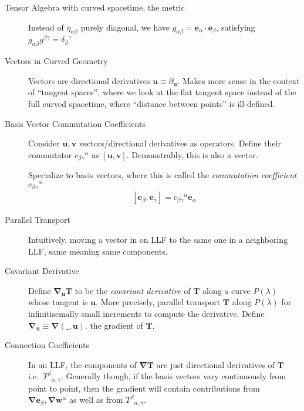 \documentclass[12pt]{report}
\newcommand{\bm}[1]{\boldsymbol{\mathbf{#1}}}
\begin{document}
\begin{description}
    \item[Tensor Algebra with curved spacetime, the metric] Instead of
        $\eta_{\alpha\beta}$ purely diagonal, we have
        $g_{\alpha\beta} = \bm{e}_\alpha \cdot \bm{e}_\beta$, satisfying
        $g_{\alpha\beta}g^{\beta\gamma} = {\delta_{\beta}}^\gamma$

    \item[Vectors in Curved Geometry] Vectors are directional derivatives
        $\bm{u} \equiv \partial_{\bm{u}}$. Makes more sense in the context of
        ``tangent spaces'', where we look at the flat tangent space instead of
        the full curved spacetime, where ``distance between points'' is
        ill-defined.

    \item[Basis Vector Commutation Coefficients] Consider $\bm{u}, \bm{v}$
        vectors/directional derivatives as operators. Define their
        commutator ${c_{\beta\gamma}}^\alpha$ as
        $\left[ \bm{u}, \bm{v} \right]$. Demonstrably, this is also a vector.

        Specialize to basis vectors, where this is called the
        \emph{commutation coefficient} ${c_{\beta\gamma}}^\alpha$
        \begin{align}
            \left[ \bm{e}_\beta, \bm{e}_\gamma \right] =
            {c_{\beta\gamma}}^\alpha \bm{e}_\alpha
        \end{align}

    \item[Parallel Transport] Intuitively, moving a vector in on LLF to the same
        one in a neighboring LLF, same meaning same components.

    \item[Covariant Derivative] Define $\bm{\nabla}_{\bm{u}} \bm{T}$ to be the
        \emph{covariant derivative} of $\bm{T}$ along a curve $P(\lambda)$ whose
        tangent is $\bm{u}$. More precisely, parallel transport $\bm{T}$ along
        $P(\lambda)$ for infinitisemally small increments to compute the
        derivative. Define $\bm{\nabla}_{\bm{u}} \equiv \bm{\nabla}(\_, \bm{u})$.
        the gradient of $\bm{T}$.

    \item[Connection Coefficients] In an LLF, the components of
        $\bm{\nabla}\bm{T}$ are just directional derivatives of $\bm{T}$ i.e.\
        ${T^\beta}_{\alpha,\gamma}$. Generally though, if the basis vectors vary
        continuously from point to point, then the gradient will contain
        contributions from $\bm{\nabla}\bm{e}_\beta, \bm{\nabla}\bm{w}^\alpha$
        as well as from ${T^\beta}_{\alpha,\gamma}$.


\end{description}
\end{document}
